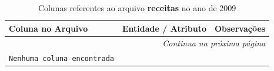 \normalsize

\vspace{0.5cm}

\small
\begin{longtable}{|p{4.0cm}|p{5.0cm}|p{5.5cm}|}
\caption{Colunas referentes ao arquivo \textbf{receitas} no ano de 2009}
\label{tabela-mapeamento-base-grupo-receitas-periodo-2009} \\ 
    \hline
    \textbf{Coluna no Arquivo} & \textbf{Entidade / Atributo} & \textbf{Observações} \\ \hline
    \endhead

    \hline \multicolumn{3}{r}{\textit{Continua na próxima página}} \\ \hline
    \endfoot

    \hline
    \endlastfoot

    \texttt{Nenhuma coluna encontrada} &  & \\ \hline 
\end{longtable}
\normalsize

\vspace{0.5cm}


